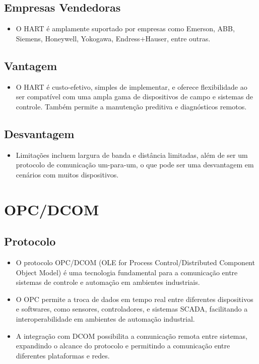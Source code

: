 \documentclass[a4paper,11pt]{article} %
\begin{document}
\subsection{Empresas Vendedoras}
\begin{itemize}
    \item O HART é amplamente suportado por empresas como Emerson, ABB, Siemens, Honeywell, Yokogawa, Endress+Hauser, entre outras.
\end{itemize}

\subsection{Vantagem}
\begin{itemize}
    \item O HART é custo-efetivo, simples de implementar, e oferece flexibilidade ao ser compatível com uma ampla gama de dispositivos de campo e sistemas de controle. Também permite a manutenção preditiva e diagnósticos remotos.
\end{itemize}

\subsection{Desvantagem}
\begin{itemize}
    \item Limitações incluem largura de banda e distância limitadas, além de ser um protocolo de comunicação um-para-um, o que pode ser uma desvantagem em cenários com muitos dispositivos.
\end{itemize}


\section{OPC/DCOM}

\subsection{Protocolo}
\begin{itemize}
    \item O protocolo OPC/DCOM (OLE for Process Control/Distributed Component Object Model) é uma tecnologia fundamental para a comunicação entre sistemas de controle e automação em ambientes industriais.
    \item O OPC permite a troca de dados em tempo real entre diferentes dispositivos e softwares, como sensores, controladores, e sistemas SCADA, facilitando a interoperabilidade em ambientes de automação industrial.
    \item A integração com DCOM possibilita a comunicação remota entre sistemas, expandindo o alcance do protocolo e permitindo a comunicação entre diferentes plataformas e redes.
\end{itemize}
\end{document}
